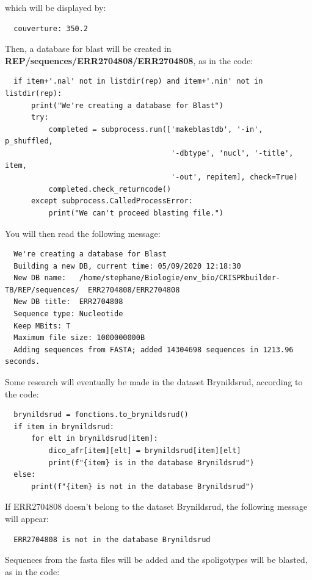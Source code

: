 \documentclass[twoside,a4paper,11pt,frenchb,openany]{report}
\begin{document}
    which will be displayed by:

    \begin{verbatim}
  couverture: 350.2        
\end{verbatim}

    Then, a database for blast will be created in
\textbf{REP/sequences/ERR2704808/ERR2704808}, as in the code:

\begin{verbatim}
  if item+'.nal' not in listdir(rep) and item+'.nin' not in listdir(rep):
      print("We're creating a database for Blast")
      try:
          completed = subprocess.run(['makeblastdb', '-in', p_shuffled,
                                      '-dbtype', 'nucl', '-title', item,
                                      '-out', repitem], check=True)
          completed.check_returncode()
      except subprocess.CalledProcessError:
          print("We can't proceed blasting file.")
\end{verbatim}

    You will then read the following message:

    \begin{verbatim}
  We're creating a database for Blast
  Building a new DB, current time: 05/09/2020 12:18:30
  New DB name:   /home/stephane/Biologie/env_bio/CRISPRbuilder-TB/REP/sequences/  ERR2704808/ERR2704808
  New DB title:  ERR2704808
  Sequence type: Nucleotide
  Keep MBits: T
  Maximum file size: 1000000000B
  Adding sequences from FASTA; added 14304698 sequences in 1213.96 seconds.
\end{verbatim}

    Some research will eventually be made in the dataset Brynildsrud,
according to the code:

\begin{verbatim}
  brynildsrud = fonctions.to_brynildsrud()
  if item in brynildsrud:
      for elt in brynildsrud[item]:
          dico_afr[item][elt] = brynildsrud[item][elt]
          print(f"{item} is in the database Brynildsrud")
  else:
      print(f"{item} is not in the database Brynildsrud")
\end{verbatim}

    If ERR2704808 doesn't belong to the dataset Brynildsrud, the following
message will appear:

    \begin{verbatim}
  ERR2704808 is not in the database Brynildsrud
\end{verbatim}

    Sequences from the fasta files will be added and the spoligotypes will
be blasted, as in the code:
\end{document}
